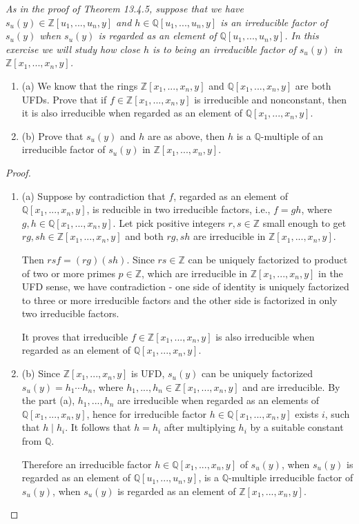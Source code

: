 \documentclass[11pt,a4paper]{article}
\newcommand{\be} {\begin{enumerate}}
\newcommand{\ee} {\end{enumerate}}
\begin{document}
{\it As in the proof of Theorem 13.4.5, suppose that we have $s_u(y)\in \mathbb{Z}[u_1,...,u_n,y]$ and $h\in \mathbb{Q}[u_1,...,u_n,y]$ is an irreducible factor of $s_u(y)$ when $s_u(y)$ is regarded as an element of $\mathbb{Q}[u_1,...,u_n,y]$. In this exercise we will study how close $h$ is to being an irreducible factor of $s_u(y)$ in $\mathbb{Z}[x_1,...,x_n,y]$.
\be
\item[(a)] We know that the rings $\mathbb{Z}[x_1,...,x_n,y]$ and $\mathbb{Q}[x_1,...,x_n,y]$ are both UFDs. Prove that if $f\in\mathbb{Z}[x_1,...,x_n,y]$ is irreducible and nonconstant, then it is also irreducible when regarded as an element of $\mathbb{Q}[x_1,...,x_n,y]$.
\item[(b)] Prove that $s_u(y)$ and $h$ are as above, then $h$ is a $\mathbb{Q}$-multiple of an irreducible factor of $s_u(y)$ in  $\mathbb{Z}[x_1,...,x_n,y]$. 
\ee
\begin{proof}
\be
\item[(a)] Suppose by contradiction that $f$, regarded as an element of $\mathbb{Q}[x_1,...,x_n,y]$, is reducible in two irreducible factors, i.e., $f=gh$, where $g,h\in\mathbb{Q}[x_1,...,x_n,y]$. Let pick positive integers $r,s\in\mathbb{Z}$ small enough to get $rg,sh\in\mathbb{Z}[x_1,...,x_n,y]$ and both $rg,sh$ are  irreducible in  $\mathbb{Z}[x_1,...,x_n,y]$.

Then $rsf=(rg)(sh)$. Since $rs\in\mathbb{Z}$ can be uniquely factorized to product of two or more primes $p\in\mathbb{Z}$, which are irreducible in $\mathbb{Z}[x_1,...,x_n,y]$ in the UFD sense, we have contradiction - one side of identity is uniquely factorized to three or more irreducible factors and the other side is factorized in only two irreducible factors. 

It proves that irreducible $f\in\mathbb{Z}[x_1,...,x_n,y]$  is also irreducible when regarded as an element of $\mathbb{Q}[x_1,...,x_n,y]$.

\item[(b)] Since $\mathbb{Z}[x_1,...,x_n,y]$ is UFD, $s_u(y)$ can be uniquely factorized $s_u(y)=h_1\cdots h_n$, where $h_1,...,h_n\in\mathbb{Z}[x_1,...,x_n,y]$ and are irreducible. By the part (a), $h_1,...,h_n$ are irreducible when regarded as an elements of $\mathbb{Q}[x_1,...,x_n,y]$, hence for irreducible factor $h\in\mathbb{Q}[x_1,...,x_n,y]$ exists $i$, such that $h\mid h_i$. It follows that $h=h_i$ after multiplying $h_i$ by a suitable constant from $\mathbb{Q}$.

Therefore an irreducible factor $h\in\mathbb{Q}[x_1,...,x_n,y]$ of $s_u(y)$, when $s_u(y)$ is regarded as an element of $\mathbb{Q}[u_1,...,u_n,y]$, is a $\mathbb{Q}$-multiple irreducible factor of $s_u(y)$, when $s_u(y)$ is regarded as an element of  $\mathbb{Z}[x_1,...,x_n,y]$.
\ee
\end{proof}
}
\end{document}
